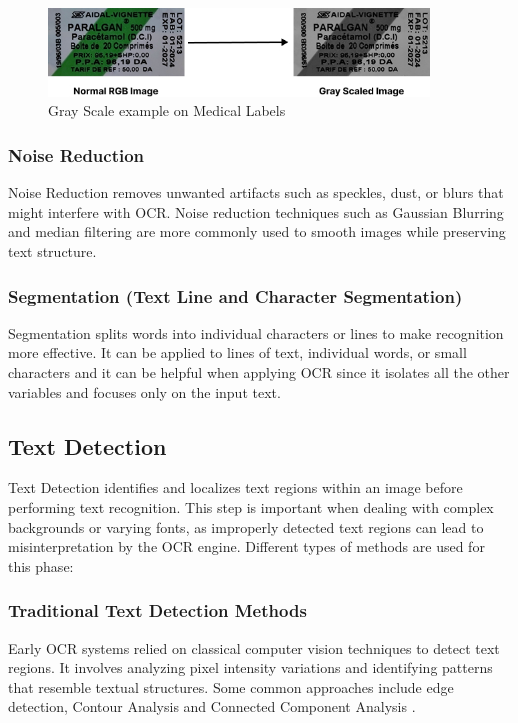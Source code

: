\begin{figure}[H]
    \centering
    \includegraphics[width=0.90\textwidth]{Figures/Chapter 1/Gray_scale.jpg}
    \caption{Gray Scale example on Medical Labels}
    \label{fig:grayscale}
\end{figure}

\subsubsection{Noise Reduction}
Noise Reduction removes unwanted artifacts such as speckles, dust, or blurs that might interfere with OCR. Noise reduction techniques such as Gaussian Blurring and median filtering are more commonly used to smooth images while preserving text structure. %

\subsubsection{Segmentation (Text Line and Character Segmentation)}
Segmentation splits words into individual characters or lines to make recognition more effective. It can be applied to lines of text, individual words, or small characters and it can be helpful when applying OCR since it isolates all the other variables and focuses only on the input text.%

\subsection{Text Detection}
Text Detection identifies and localizes text regions within an image before performing text recognition. This step is important when dealing with complex backgrounds or varying fonts, as improperly detected text regions can lead to misinterpretation by the OCR engine. Different types of methods are used for this phase: %

\subsubsection{Traditional Text Detection Methods}
Early OCR systems relied on classical computer vision techniques to detect text regions. It involves analyzing pixel intensity variations and identifying patterns that resemble textual structures. Some common approaches include edge detection, Contour Analysis and Connected Component Analysis \cite{gllavata2003robust}. %

